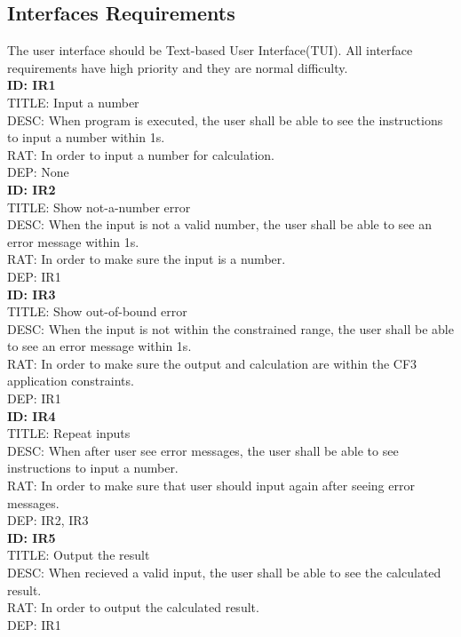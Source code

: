 \documentclass[12pt]{article}
\begin{document}
{\begin{normalsize}
\subsection{Interfaces Requirements}
The user interface should be Text-based User Interface(TUI). All interface requirements have high priority and they are normal difficulty.\\
\textbf{ID: IR1} \\
TITLE: Input a number \\
DESC: When program is executed, the user shall be able to see the instructions to input a number within 1s. \\
RAT: In order to input a number for calculation.\\
DEP: None\\
\textbf{ID: IR2} \\
TITLE: Show not-a-number error\\
DESC: When the input is not a valid number, the user shall be able to see an error message within 1s. \\
RAT: In order to make sure the input is a number.\\
DEP: IR1\\
\textbf{ID: IR3} \\
TITLE: Show out-of-bound error\\
DESC: When the input is not within the constrained range, the user shall be able to see an error message within 1s. \\
RAT: In order to make sure the output and calculation are within the CF3 application constraints.\\
DEP: IR1\\
\textbf{ID: IR4} \\
TITLE: Repeat inputs\\
DESC: When after user see error messages, the user shall be able to see instructions to input a number. \\
RAT: In order to make sure that user should input again after seeing error messages.\\
DEP: IR2, IR3\\
\textbf{ID: IR5} \\
TITLE: Output the result\\
DESC: When recieved a valid input, the user shall be able to see the calculated result. \\
RAT: In order to output the calculated result.\\
DEP: IR1\\

\end{normalsize}}
\end{document}

